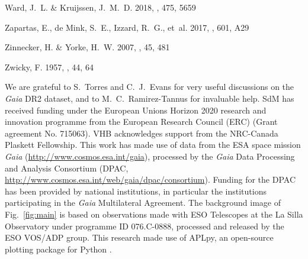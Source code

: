 \documentclass[apjl,twocolumn]{emulateapj}
\DeclareRobustCommand{\Figref}[1]{Fig.~\ref{#1}}
\begin{document}
\begin{thebibliography}{50}
{Ward}, J.~L. \& {Kruijssen}, J.~M.~D. 2018, \mnras, 475, 5659

{Zapartas}, E., {de Mink}, S.~E., {Izzard}, R.~G., {et~al.} 2017, \aap, 601,
  A29

{Zinnecker}, H. \& {Yorke}, H.~W. 2007, \araa, 45, 481

{Zwicky}, F. 1957, \zap, 44, 64
\end{thebibliography}

\begin{acknowledgements}
  \small
  We are grateful to S.~Torres and C.~J.~Evans for 
  very useful discussions on the
  \emph{Gaia} DR2 dataset, and to M.~C.~Ramirez-Tannus for invaluable help.
  SdM has received funding under the European Unions Horizon 2020 research and innovation programme from the European Research
  Council (ERC) (Grant agreement No. 715063). VHB acknowledges support from the NRC-Canada Plaskett Fellowship.
  This work has made use of data from the ESA space mission \emph{Gaia} (\url{http://www.cosmos.esa.int/gaia}), processed by the \emph{Gaia} Data Processing and Analysis Consortium (DPAC, \url{http://www.cosmos.esa.int/web/gaia/dpac/consortium}). Funding for the DPAC has been provided by national institutions, in particular the institutions participating in the \emph{Gaia} Multilateral Agreement. 
  The background image of \Figref{fig:main} is based on observations
  made with ESO Telescopes at the La Silla Observatory under programme
  ID 076.C-0888, processed and released by the ESO VOS/ADP group.
  This research made use of APLpy, an open-source plotting package for Python \citep[][]{robitaille:12}.
\end{acknowledgements}
\end{document}
